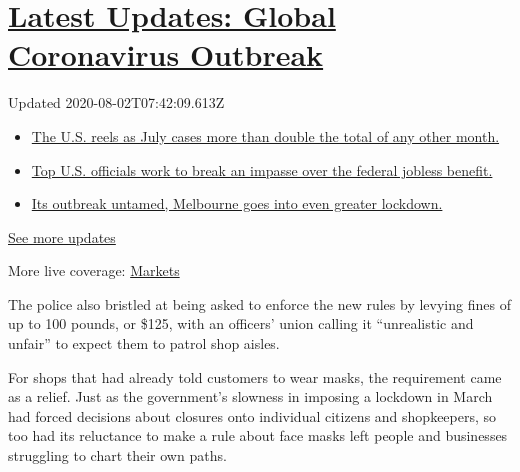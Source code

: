 \hypertarget{latest-updates-global-coronavirus-outbreak}{%
\section{\texorpdfstring{\href{https://www.nytimes.com/2020/08/01/world/coronavirus-covid-19.html?action=click\&pgtype=Article\&state=default\&region=MAIN_CONTENT_1\&context=storylines_live_updates}{Latest
Updates: Global Coronavirus
Outbreak}}{Latest Updates: Global Coronavirus Outbreak}}\label{latest-updates-global-coronavirus-outbreak}}

Updated 2020-08-02T07:42:09.613Z

\begin{itemize}
\tightlist
\item
  \href{https://www.nytimes.com/2020/08/01/world/coronavirus-covid-19.html?action=click\&pgtype=Article\&state=default\&region=MAIN_CONTENT_1\&context=storylines_live_updates\#link-34047410}{The
  U.S. reels as July cases more than double the total of any other
  month.}
\item
  \href{https://www.nytimes.com/2020/08/01/world/coronavirus-covid-19.html?action=click\&pgtype=Article\&state=default\&region=MAIN_CONTENT_1\&context=storylines_live_updates\#link-780ec966}{Top
  U.S. officials work to break an impasse over the federal jobless
  benefit.}
\item
  \href{https://www.nytimes.com/2020/08/01/world/coronavirus-covid-19.html?action=click\&pgtype=Article\&state=default\&region=MAIN_CONTENT_1\&context=storylines_live_updates\#link-2bc8948}{Its
  outbreak untamed, Melbourne goes into even greater lockdown.}
\end{itemize}

\href{https://www.nytimes.com/2020/08/01/world/coronavirus-covid-19.html?action=click\&pgtype=Article\&state=default\&region=MAIN_CONTENT_1\&context=storylines_live_updates}{See
more updates}

More live coverage:
\href{https://www.nytimes.com/live/2020/07/31/business/stock-market-today-coronavirus?action=click\&pgtype=Article\&state=default\&region=MAIN_CONTENT_1\&context=storylines_live_updates}{Markets}

The police also bristled at being asked to enforce the new rules by
levying fines of up to 100 pounds, or \$125, with an officers' union
calling it ``unrealistic and unfair'' to expect them to patrol shop
aisles.

For shops that had already told customers to wear masks, the requirement
came as a relief. Just as the government's slowness in imposing a
lockdown in March had forced decisions about closures onto individual
citizens and shopkeepers, so too had its reluctance to make a rule about
face masks left people and businesses struggling to chart their own
paths.

